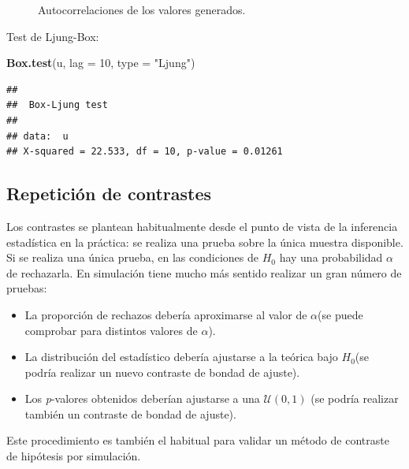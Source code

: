 \documentclass[
]{book}
\newenvironment{Shaded}{\begin{snugshade}}{\end{snugshade}}
\newcommand{\DataTypeTok}[1]{\textcolor[rgb]{0.13,0.29,0.53}{#1}}
\newcommand{\DecValTok}[1]{\textcolor[rgb]{0.00,0.00,0.81}{#1}}
\newcommand{\KeywordTok}[1]{\textcolor[rgb]{0.13,0.29,0.53}{\textbf{#1}}}
\newcommand{\NormalTok}[1]{#1}
\newcommand{\StringTok}[1]{\textcolor[rgb]{0.31,0.60,0.02}{#1}}
\theoremstyle{break}
\theoremstyle{definition}
\theoremstyle{definition}
\theoremstyle{definition}
\theoremstyle{remark}
\let\BeginKnitrBlock\begin \let\EndKnitrBlock\end
\begin{document}
\begin{enumerate}
\begin{figure}[!htb]
  \caption{Autocorrelaciones de los valores generados.}\label{fig:plot-acf}
  \end{figure}

  Test de Ljung-Box:

\begin{Shaded}
\begin{Highlighting}[]
\KeywordTok{Box.test}\NormalTok{(u, }\DataTypeTok{lag =} \DecValTok{10}\NormalTok{, }\DataTypeTok{type =} \StringTok{"Ljung"}\NormalTok{)}
\end{Highlighting}
\end{Shaded}

\begin{verbatim}
## 
##  Box-Ljung test
## 
## data:  u
## X-squared = 22.533, df = 10, p-value = 0.01261
\end{verbatim}
\end{enumerate}

\hypertarget{repeticiuxf3n-de-contrastes}{%
\subsection{Repetición de contrastes}\label{repeticiuxf3n-de-contrastes}}

Los contrastes se plantean habitualmente desde el punto de vista de
la inferencia estadística en la práctica: se realiza una prueba
sobre la única muestra disponible. Si se realiza una única prueba,
en las condiciones de \(H_0\) hay
una probabilidad \(\alpha\) de rechazarla.
En simulación tiene mucho más sentido realizar un gran número de
pruebas:

\begin{itemize}
\item
  La proporción de rechazos debería aproximarse al valor de
  \(\alpha\)(se puede comprobar para distintos valores de \(\alpha\)).
\item
  La distribución del estadístico debería ajustarse a la teórica
  bajo \(H_0\)(se podría realizar un nuevo contraste de bondad
  de ajuste).
\item
  Los \emph{p}-valores obtenidos deberían ajustarse a una
  \(\mathcal{U}\left(0,1\right)\) (se podría realizar también un
  contraste de bondad de ajuste).
\end{itemize}

Este procedimiento es también el habitual para validar un método de
contraste de hipótesis por simulación.

\BeginKnitrBlock{example}
\protect\hypertarget{exm:rep-test-randu}{}{\label{exm:rep-test-randu} }
\EndKnitrBlock{example}
\end{document}
